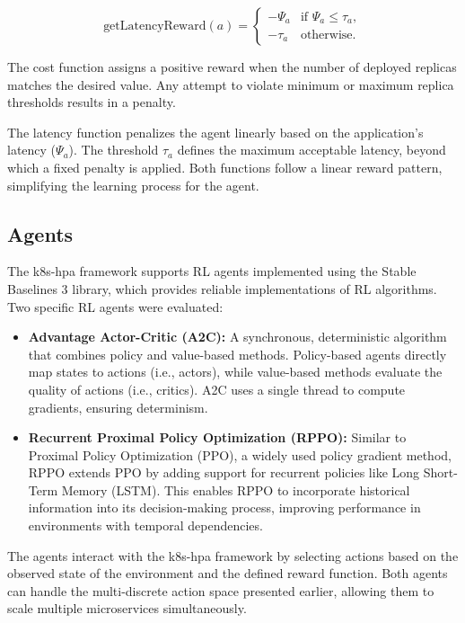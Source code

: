 \documentclass[conference]{IEEEtran}
\begin{document}
\begin{equation}
    \text{getLatencyReward}(a) =
    \begin{cases}
        -\Psi_a & \text{if } \Psi_a \leq \tau_a, \\
        -\tau_a & \text{otherwise.}
    \end{cases}
    \label{eq:latency-reward}
\end{equation}

The cost function assigns a positive reward when the number of deployed replicas matches the desired value. Any attempt to violate minimum or maximum replica thresholds results in a penalty.

The latency function penalizes the agent linearly based on the application's latency ($\Psi_a$). The threshold $\tau_a$ defines the maximum acceptable latency, beyond which a fixed penalty is applied. Both functions follow a linear reward pattern, simplifying the learning process for the agent.

\subsection{Agents}

The k8s-hpa framework supports RL agents implemented using the Stable Baselines 3 \cite{raffin2019stable} library, which provides reliable implementations of RL algorithms. Two specific RL agents were evaluated:

\begin{itemize}
    \item \textbf{Advantage Actor-Critic (A2C):} A synchronous, deterministic algorithm that combines policy and value-based methods. Policy-based agents directly map states to actions (i.e., actors), while value-based methods evaluate the quality of actions (i.e., critics). A2C uses a single thread to compute gradients, ensuring determinism.
    \item \textbf{Recurrent Proximal Policy Optimization (RPPO):} Similar to Proximal Policy Optimization (PPO), a widely used policy gradient method, RPPO extends PPO by adding support for recurrent policies like Long Short-Term Memory (LSTM). This enables RPPO to incorporate historical information into its decision-making process, improving performance in environments with temporal dependencies.
\end{itemize}

The agents interact with the k8s-hpa framework by selecting actions based on the observed state of the environment and the defined reward function. Both agents can handle the multi-discrete action space presented earlier, allowing them to scale multiple microservices simultaneously.
\end{document}
